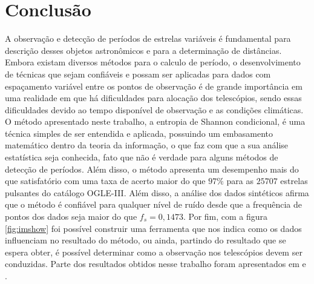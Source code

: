 \chapter{Conclusão}
\label{cap:conclusao}

A observação e detecção de períodos de estrelas variáveis é fundamental para descrição desses objetos astronômicos e para a determinação de distâncias. Embora existam diversos métodos para o calculo de período, o desenvolvimento de técnicas que sejam confiáveis e possam ser aplicadas para dados com espaçamento variável entre os pontos de observação é de grande importância em uma realidade em que há dificuldades para alocação dos telescópios, sendo essas dificuldades devido ao tempo disponível de observação e as condições climáticas. O método apresentado neste trabalho, a entropia de Shannon condicional, é uma técnica simples de ser entendida e aplicada, possuindo  um embasamento matemático dentro da teoria da informação, o que faz com que a sua análise estatística seja conhecida, fato que não é verdade para alguns métodos de detecção de períodos. Além disso, o método  apresenta um desempenho mais do que satisfatório com uma taxa de acerto maior do que $97\%$ para as $25707$ estrelas pulsantes do catálogo OGLE-III. Além disso, a análise dos dados sintéticos afirma que o método é confiável para qualquer nível de ruído desde que a frequência de pontos dos dados seja maior do que $f_s = 0,1473$. Por fim, com a figura \ref{fig:imshow} foi possível  construir uma ferramenta que nos indica como os dados influenciam no resultado do método, ou ainda, partindo do resultado que se espera obter, é possível determinar como a observação nos telescópios devem ser conduzidas. Parte dos resultados obtidos nesse trabalho foram apresentados em \citet{gabe1} e \citet{gabe2}.
